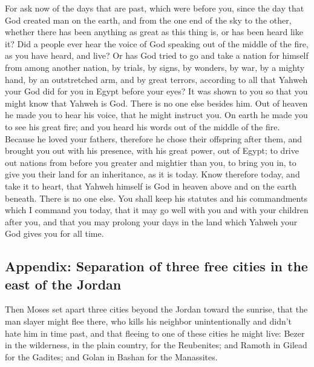 For ask now of the days that are past, which were before
you, since the day that God created man on the earth, and from the one
end of the sky to the other, whether there has been anything as great as
this thing is, or has been heard like it?  Did a people
ever hear the voice of God speaking out of the middle of the fire, as
you have heard, and live?  Or has God tried to go and
take a nation for himself from among another nation, by trials, by
signs, by wonders, by war, by a mighty hand, by an outstretched arm, and
by great terrors, according to all that Yahweh your God did for you in
Egypt before your eyes?  It was shown to you so that you
might know that Yahweh is God. There is no one else besides him.
 Out of heaven he made you to hear his voice, that he
might instruct you. On earth he made you to see his great fire; and you
heard his words out of the middle of the fire.  Because
he loved your fathers, therefore he chose their offspring after them,
and brought you out with his presence, with his great power, out of
Egypt;  to drive out nations from before you greater and
mightier than you, to bring you in, to give you their land for an
inheritance, as it is today.  Know therefore today, and
take it to heart, that Yahweh himself is God in heaven above and on the
earth beneath. There is no one else.  You shall keep his
statutes and his commandments which I command you today, that it may go
well with you and with your children after you, and that you may prolong
your days in the land which Yahweh your God gives you for all time.

\hypertarget{appendix-separation-of-three-free-cities-in-the-east-of-the-jordan}{%
\subsection{Appendix: Separation of three free cities in the east of the
Jordan}\label{appendix-separation-of-three-free-cities-in-the-east-of-the-jordan}}

 Then Moses set apart three cities beyond the Jordan
toward the sunrise,  that the man slayer might flee
there, who kills his neighbor unintentionally and didn't hate him in
time past, and that fleeing to one of these cities he might live:
 Bezer in the wilderness, in the plain country, for the
Reubenites; and Ramoth in Gilead for the Gadites; and Golan in Bashan
for the Manassites.

